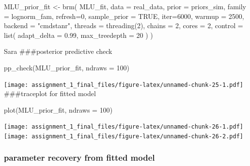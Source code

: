 \documentclass[
]{article}
\newenvironment{Shaded}{\begin{snugshade}}{\end{snugshade}}
\newcommand{\AttributeTok}[1]{\textcolor[rgb]{0.77,0.63,0.00}{#1}}
\newcommand{\ConstantTok}[1]{\textcolor[rgb]{0.00,0.00,0.00}{#1}}
\newcommand{\DecValTok}[1]{\textcolor[rgb]{0.00,0.00,0.81}{#1}}
\newcommand{\FloatTok}[1]{\textcolor[rgb]{0.00,0.00,0.81}{#1}}
\newcommand{\FunctionTok}[1]{\textcolor[rgb]{0.00,0.00,0.00}{#1}}
\newcommand{\NormalTok}[1]{#1}
\newcommand{\OtherTok}[1]{\textcolor[rgb]{0.56,0.35,0.01}{#1}}
\newcommand{\StringTok}[1]{\textcolor[rgb]{0.31,0.60,0.02}{#1}}
\begin{document}
\begin{Shaded}
\begin{Highlighting}[]
\NormalTok{MLU\_prior\_fit }\OtherTok{\textless{}{-}} \FunctionTok{brm}\NormalTok{(}
\NormalTok{  MLU\_fit, }
  \AttributeTok{data =}\NormalTok{ real\_data, }
  \AttributeTok{prior =}\NormalTok{ priors\_sim,}
  \AttributeTok{family =}\NormalTok{ lognorm\_fam,}
  \AttributeTok{refresh=}\DecValTok{0}\NormalTok{,}
  \AttributeTok{sample\_prior =} \ConstantTok{TRUE}\NormalTok{,}
  \AttributeTok{iter=}\DecValTok{6000}\NormalTok{,}
  \AttributeTok{warmup =} \DecValTok{2500}\NormalTok{,}
  \AttributeTok{backend =} \StringTok{"cmdstanr"}\NormalTok{,}
  \AttributeTok{threads =} \FunctionTok{threading}\NormalTok{(}\DecValTok{2}\NormalTok{),}
  \AttributeTok{chains =} \DecValTok{2}\NormalTok{,}
  \AttributeTok{cores =} \DecValTok{2}\NormalTok{,}
  \AttributeTok{control =} \FunctionTok{list}\NormalTok{(}
    \AttributeTok{adapt\_delta =} \FloatTok{0.99}\NormalTok{,}
    \AttributeTok{max\_treedepth =} \DecValTok{20}
\NormalTok{)}
\NormalTok{)}
\end{Highlighting}
\end{Shaded}

Sara \#\#\#posterior predictive check

\begin{Shaded}
\begin{Highlighting}[]
\FunctionTok{pp\_check}\NormalTok{(MLU\_prior\_fit, }\AttributeTok{ndraws =} \DecValTok{100}\NormalTok{)}
\end{Highlighting}
\end{Shaded}

\texttt{[image: assignment\_1\_final\_files/figure-latex/unnamed-chunk-25-1.pdf]}
\#\#\#traceplot for fitted model

\begin{Shaded}
\begin{Highlighting}[]
\FunctionTok{plot}\NormalTok{(MLU\_prior\_fit, }\AttributeTok{ndraws =} \DecValTok{100}\NormalTok{)}
\end{Highlighting}
\end{Shaded}

\texttt{[image: assignment\_1\_final\_files/figure-latex/unnamed-chunk-26-1.pdf]}
\texttt{[image: assignment\_1\_final\_files/figure-latex/unnamed-chunk-26-2.pdf]}

\hypertarget{parameter-recovery-from-fitted-model}{%
\subsubsection{parameter recovery from fitted
model}\label{parameter-recovery-from-fitted-model}}
\end{document}
